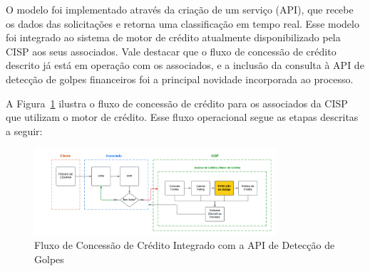 \documentclass[12pt,a4paper]{article}
\begin{document}
O modelo foi implementado através da criação de um serviço (API), que recebe os dados das solicitações e retorna uma classificação em tempo real. Esse modelo foi integrado ao sistema de motor de crédito atualmente disponibilizado pela CISP aos seus associados. Vale destacar que o fluxo de concessão de crédito descrito já está em operação com os associados, e a inclusão da consulta à API de detecção de golpes financeiros foi a principal novidade incorporada ao processo.

A Figura~\ref{fig:fluxo_credito} ilustra o fluxo de concessão de crédito para os associados da CISP que utilizam o motor de crédito. Esse fluxo operacional segue as etapas descritas a seguir:

\begin{figure}[H]
    \centering
    \includegraphics[width=0.8\textwidth]{motordecredito.png}
    \caption{Fluxo de Concessão de Crédito Integrado com a API de Detecção de Golpes}
    \label{fig:fluxo_credito}
\end{figure}
\end{document}
